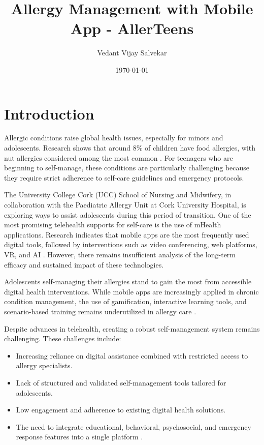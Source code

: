 \documentclass[MScCS]{uccthesis}
\title{Allergy Management with Mobile App - AllerTeens}
\author{Vedant Vijay Salvekar}
\date{\today}
\begin{document}
\chapter{Introduction}


Allergic conditions raise global health issues, especially for minors and adolescents. Research shows that around 8\% of children have food allergies, with nut allergies considered among the most common \cite{sullivan2024telehealth}. For teenagers who are beginning to self-manage, these conditions are particularly challenging because they require strict adherence to self-care guidelines and emergency protocols.  

The University College Cork (UCC) School of Nursing and Midwifery, in collaboration with the Paediatric Allergy Unit at Cork University Hospital, is exploring ways to assist adolescents during this period of transition. One of the most promising telehealth supports for self-care is the use of mHealth applications. Research indicates that mobile apps are the most frequently used digital tools, followed by interventions such as video conferencing, web platforms, VR, and AI \cite{majeed2015apps}. However, there remains insufficient analysis of the long-term efficacy and sustained impact of these technologies.  

Adolescents self-managing their allergies stand to gain the most from accessible digital health interventions. While mobile apps are increasingly applied in chronic condition management, the use of gamification, interactive learning tools, and scenario-based training remains underutilized in allergy care \cite{sullivan2024telehealth, broome2021fasst}.  

Despite advances in telehealth, creating a robust self-management system remains challenging. These challenges include:
\begin{itemize}
    \item Increasing reliance on digital assistance combined with restricted access to allergy specialists.
    \item Lack of structured and validated self-management tools tailored for adolescents.
    \item Low engagement and adherence to existing digital health solutions.
    \item The need to integrate educational, behavioral, psychosocial, and emergency response features into a single platform \cite{kwen2022foodallergy}.
\end{itemize}
\end{document}
